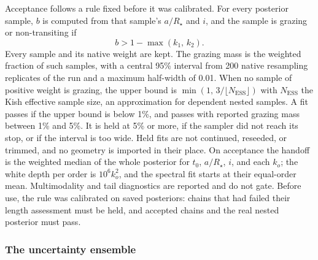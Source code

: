Acceptance follows a rule fixed before it was calibrated. For every
posterior sample, $b$ is computed from that sample's $a/R_\star$ and
$i$, and the sample is grazing or non-transiting if
\begin{equation}
 b > 1-\max(k_1,\,k_2).
 \label{eq:grazing}
\end{equation}
Every sample and its native weight are kept. The grazing mass is the
weighted fraction of such samples, with a central 95\% interval from 200
native resampling replicates of the run and a maximum half-width of
0.01. When no sample of positive weight is grazing, the upper bound is
$\min(1,\,3/\lfloor N_{\mathrm{ESS}}\rfloor)$ with $N_{\mathrm{ESS}}$ the
Kish effective sample size, an approximation for dependent nested
samples. A fit passes if the upper bound is below 1\%, and passes with
reported grazing mass between 1\% and 5\%. It is held at 5\% or more,
if the sampler did not reach its stop, or if the interval is too wide.
Held fits are not continued, reseeded, or trimmed, and no geometry is
imported in their place. On acceptance the handoff is the weighted
median of the whole posterior for $t_0$, $a/R_\star$, $i$, and each
$k_o$; the white depth per order is $10^6 k_o^2$, and the spectral fit
starts at their equal-order mean. Multimodality and tail diagnostics are
reported and do not gate. Before use, the rule was calibrated on saved
posteriors: chains that had failed their length assessment must be held,
and accepted chains and the real nested posterior must pass.

\subsubsection{The uncertainty ensemble}
\label{sec:ensemble}


